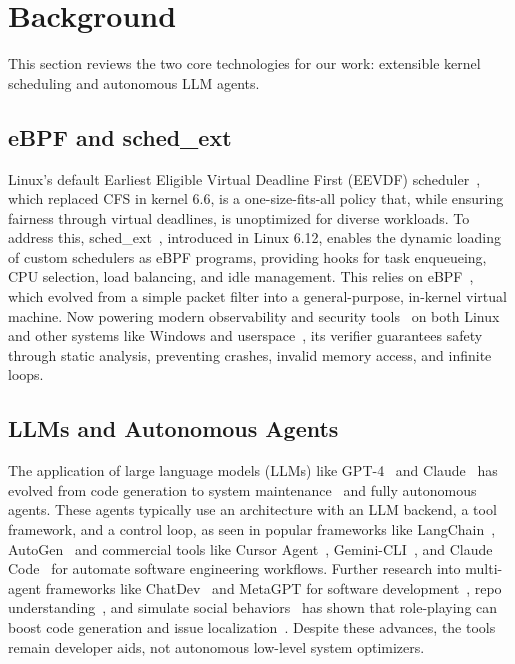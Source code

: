 \section{Background}
\label{sec:background}

This section reviews the two core technologies for our work: extensible kernel scheduling and autonomous LLM agents.

\subsection{eBPF and sched\_ext}

Linux's default Earliest Eligible Virtual Deadline First (EEVDF) scheduler~\cite{eevdf2024}, which replaced CFS in kernel 6.6, is a one-size-fits-all policy that, while ensuring fairness through virtual deadlines, is unoptimized for diverse workloads. To address this, sched\_ext~\cite{schedext2024}, introduced in Linux 6.12, enables the dynamic loading of custom schedulers as eBPF programs, providing hooks for task enqueueing, CPU selection, load balancing, and idle management. This relies on eBPF~\cite{ebpfio}, which evolved from a simple packet filter into a general-purpose, in-kernel virtual machine. Now powering modern observability and security tools~\cite{tracee,cilium} on both Linux and other systems like Windows and userspace~\cite{zheng2025extending, windows-ebpf}, its verifier guarantees safety through static analysis, preventing crashes, invalid memory access, and infinite loops.

\subsection{LLMs and Autonomous Agents}

The application of large language models (LLMs) like GPT-4~\cite{openai2023gpt4} and Claude~\cite{anthropic2024claude} has evolved from code generation to system maintenance~\cite{de2025llm} and fully autonomous agents. These agents typically use an architecture with an LLM backend, a tool framework, and a control loop, as seen in popular frameworks like LangChain~\cite{langchain}, AutoGen~\cite{autogen} and commercial tools like Cursor Agent~\cite{cursor}, Gemini-CLI~\cite{geminicli}, and Claude Code~\cite{claudecode} for automate software engineering workflows. Further research into multi-agent frameworks like ChatDev~\cite{qian2024chatdev} and MetaGPT for software development~\cite{hong2023metagpt}, repo understanding~\cite{coderesearcher2025}, and simulate social behaviors~\cite{agent4se2024} has shown that role-playing can boost code generation and issue localization~\cite{Lin2025FlowGen,Batole2025LocalizeAgent}. Despite these advances, the tools remain developer aids, not autonomous low-level system optimizers.